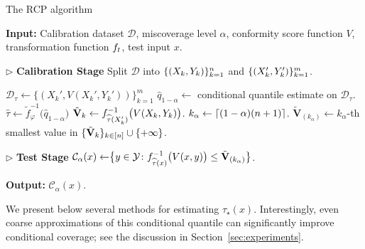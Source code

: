   \begin{algorithm}[t!] 
    \caption{The RCP algorithm}
    \label{algo:rcp}
    \begin{algorithmic}[]
      \State \textbf{Input:}
      Calibration dataset $\mathcal{D}$, miscoverage level $\alpha$, conformity score function $V$, transformation function $f_{t}$, test input $x$.

      \State $\triangleright$ \textbf{Calibration Stage}
      \State Split $\mathcal{D}$ into $\{(X_{k}, Y_{k})\}_{k = 1}^n$ and $\{(X_{k}', Y_{k}')\}_{k = 1}^m$.

      \State $\mathcal{D}_{\tau} \gets \{ (X_k', V(X_k', Y_k')) \}_{k = 1}^m$
      \State $\widehat{q}_{1 - \alpha} \gets$ conditional quantile estimate on $\mathcal{D}_{\tau}$.
      \State $\widehat{\tau} \gets \tilde{f}_\varphi^{-1} \bigl(\widehat{q}_{1 - \alpha}\bigr)$
        \State $\tilde{\mathbf{V}}_{k} \gets f_{\widehat{\tau}(X'_{k})}^{-1} \bigl(V(X_{k}, Y_{k})\bigr)$.
      \EndFor
      \State $k_{\alpha} \gets \lceil (1 - \alpha) (n + 1) \rceil$.
      \State $\tilde{\mathbf{V}}_{(k_{\alpha})} \gets k_{\alpha}$-th smallest value in $\{\tilde{\mathbf{V}}_{k}\}_{k \in [n]} \cup \{+\infty\}$.

      \State $\triangleright$ \textbf{Test Stage}
      \State \quad $\mathcal{C}_{\alpha}(x) \gets \bigr\{y \in \mathcal{Y}\colon f_{\widehat{\tau}(x)}^{-1} \bigl(V(x, y)\bigr) \leq \tilde{\mathbf{V}}_{(k_{\alpha})}\bigl\}$.

      \State \textbf{Output:} $\mathcal{C}_{\alpha}(x)$.
    \end{algorithmic}
  \label{algo:RCP}
  \end{algorithm}

  We present below several methods for estimating $\tau_\star(x)$. Interestingly, even coarse approximations of this conditional quantile can significantly improve conditional coverage; see the discussion in Section~\ref{sec:experiments}.

